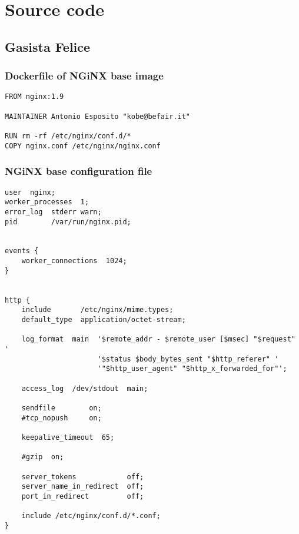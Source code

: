 \chapter{Source code}\label{source-code}

\section{Gasista Felice}\label{gasista-felice}

\subsection{Dockerfile of NGiNX base
image}\label{dockerfile-of-nginx-base-image}

\begin{verbatim}
FROM nginx:1.9

MAINTAINER Antonio Esposito "kobe@befair.it"

RUN rm -rf /etc/nginx/conf.d/*
COPY nginx.conf /etc/nginx/nginx.conf
\end{verbatim}

\subsection{NGiNX base configuration
file}\label{nginx-base-configuration-file}

\begin{verbatim}
user  nginx;
worker_processes  1;
error_log  stderr warn;
pid        /var/run/nginx.pid;


events {
    worker_connections  1024;
}


http {
    include       /etc/nginx/mime.types;
    default_type  application/octet-stream;

    log_format  main  '$remote_addr - $remote_user [$msec] "$request" '
                      '$status $body_bytes_sent "$http_referer" '
                      '"$http_user_agent" "$http_x_forwarded_for"';

    access_log  /dev/stdout  main;

    sendfile        on;
    #tcp_nopush     on;

    keepalive_timeout  65;

    #gzip  on;

    server_tokens            off;
    server_name_in_redirect  off;
    port_in_redirect         off;

    include /etc/nginx/conf.d/*.conf;
}
\end{verbatim}

